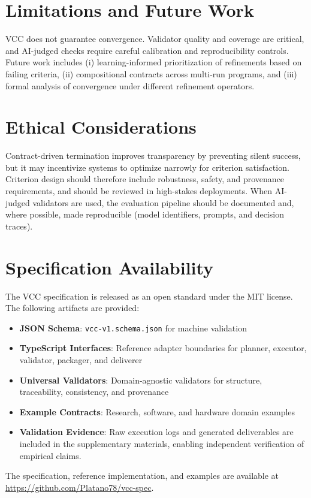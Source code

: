 \documentclass[11pt]{article}
\begin{document}
\section{Limitations and Future Work}
VCC does not guarantee convergence. Validator quality and coverage are critical, and AI-judged checks require careful calibration and reproducibility controls. Future work includes (i) learning-informed prioritization of refinements based on failing criteria, (ii) compositional contracts across multi-run programs, and (iii) formal analysis of convergence under different refinement operators.

\section{Ethical Considerations}
Contract-driven termination improves transparency by preventing silent success, but it may incentivize systems to optimize narrowly for criterion satisfaction. Criterion design should therefore include robustness, safety, and provenance requirements, and should be reviewed in high-stakes deployments. When AI-judged validators are used, the evaluation pipeline should be documented and, where possible, made reproducible (model identifiers, prompts, and decision traces).

\section{Specification Availability}
The VCC specification is released as an open standard under the MIT license. The following artifacts are provided:
\begin{itemize}[leftmargin=*]
  \item \textbf{JSON Schema}: \texttt{vcc-v1.schema.json} for machine validation
  \item \textbf{TypeScript Interfaces}: Reference adapter boundaries for planner, executor, validator, packager, and deliverer
  \item \textbf{Universal Validators}: Domain-agnostic validators for structure, traceability, consistency, and provenance
  \item \textbf{Example Contracts}: Research, software, and hardware domain examples
  \item \textbf{Validation Evidence}: Raw execution logs and generated deliverables are included in the supplementary materials, enabling independent verification of empirical claims.
\end{itemize}
The specification, reference implementation, and examples are available at \url{https://github.com/Platano78/vcc-spec}.
\end{document}
